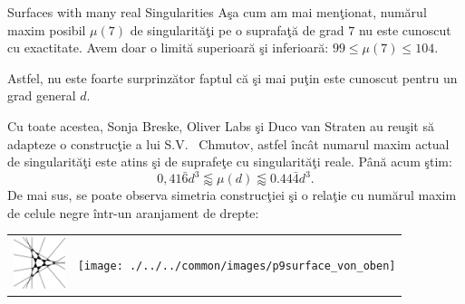 \begin{surferPage}[216 Singularities]{Surfaces with many real Singularities}
   A\c{s}a cum am mai men\c{t}ionat, num\u{a}rul maxim posibil $\mu(7)$ de singularit\u{a}\c{t}i pe o suprafa\c{t}\u{a} de grad $7$ nu este
    cunoscut cu exactitate. Avem doar o limit\u{a} superioar\u{a} \c{s}i inferioar\u{a}: $99 \le \mu(7) \le 104$.

    Astfel, nu este foarte surprinz\u{a}tor faptul c\u{a} \c{s}i mai pu\c{t}in este cunoscut pentru un grad general $d$.
    
    Cu toate acestea, Sonja Breske, Oliver Labs \c{s}i Duco van Straten au reu\c{s}it s\u{a} adapteze o
    construc\c{t}ie a lui S.V. \ Chmutov, astfel \^{i}nc\^{a}t numarul maxim actual de singularit\u{a}\c{t}i este atins \c{s}i de suprafe\c{t}e cu singularit\u{a}\c{t}i 
    reale.
    P\^{a}n\u{a} acum \c{s}tim:
    \[0,41\bar{6}d^3 \lessapprox \mu(d) \lessapprox 0.44\bar{4} d^3.\]
    De mai sus, se poate observa simetria construc\c{t}iei \c{s}i o rela\c{t}ie cu num\u{a}rul maxim de celule negre \^{i}ntr-un aranjament de drepte:
    \begin{center}
      \begin{tabular}{c@{\qquad}c}
        \includegraphics[height=1.5cm]{./../../common/images/vielesing.pdf}
        &
        \texttt{[image: ./../../common/images/p9surface\_von\_oben]}
      \end{tabular}
    \end{center}
\end{surferPage}
